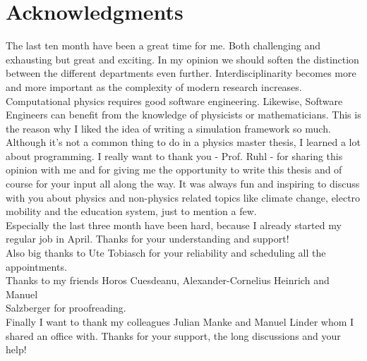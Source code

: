 

\chapter*{Acknowledgments}
\noindent
The last ten month have been a great time for me. Both challenging and exhausting but great and exciting. In my opinion we should soften the distinction between the different departments even further. Interdisciplinarity becomes more and more important as the complexity of modern research increases. Computational physics requires good software engineering. Likewise, Software Engineers can benefit from the knowledge of physicists or mathematicians. This is the reason why I liked the idea of writing a simulation framework so much. Although it's not a common thing to do in a physics master thesis, I learned a lot about programming. I really want to thank you - Prof. Ruhl - for sharing this opinion with me and for giving me the opportunity to write this thesis and of course for your input all along the way. It was always fun and inspiring to discuss with you about physics and non-physics related topics like climate change, electro mobility and the education system, just to mention a few. \\
\newline
Especially the last three month have been hard, because I already started my regular job in April. Thanks for your understanding and support!\\
\newline
Also big thanks to Ute Tobiasch for your reliability and scheduling all the appointments.\\
\newline
Thanks to my friends Horos Cuesdeanu, Alexander-Cornelius Heinrich and Manuel \\
Salzberger for proofreading.\\
\newline
Finally I want to thank my colleagues Julian Manke and Manuel Linder whom I shared an office with. Thanks for your support, the long discussions and your help! \\


